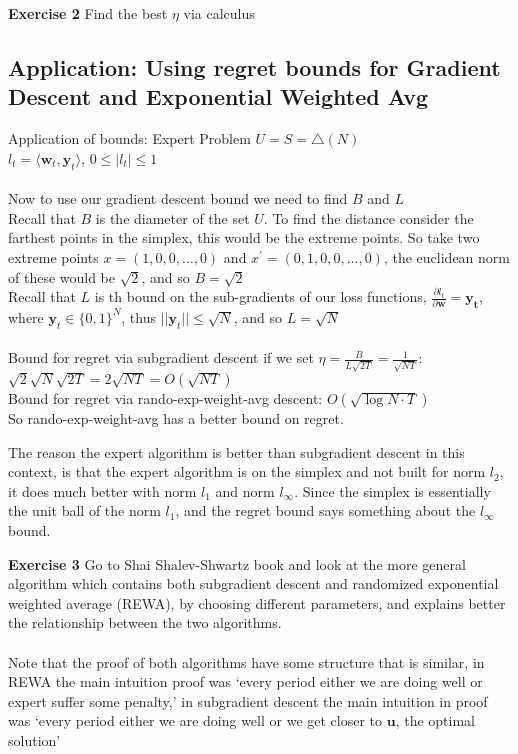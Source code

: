 \documentclass[11pt]{article}
\newcommand\tab[1][1cm]{\hspace*{#1}}
\theoremstyle{quest}
\begin{document}
\begin{tcolorbox}
\textbf{Exercise 2} Find the best $\eta$ via calculus 
\end{tcolorbox}

\subsection{Application: Using regret bounds for Gradient Descent and Exponential Weighted Avg}
\begin{tcolorbox}
Application of bounds: Expert Problem
$U=S=\triangle(N)$\\
$l_t = \langle \mathbf{w}_t, \mathbf{y}_t \rangle$, $0\le|l_t|\le 1$\\ \\ 
Now to use our gradient descent bound we need to find $B$ and $L$ \\
\tab Recall that $B$ is the diameter of the set $U$. To find the distance consider the farthest points in the simplex, this would be the extreme points. So take two extreme points $x = (1, 0 , 0, \dots, 0)$ and $x^\prime = (0, 1, 0 , 0, \dots, 0)$, the euclidean norm of these would be $\sqrt{2}$, and so $B=\sqrt{2}$\\
\tab Recall that $L$ is th bound on the sub-gradients of our loss functions, $\frac{\partial l_t}{\partial \mathbf{w}}=\mathbf{y_t}$, where $\mathbf{y}_t\in \{0,1\}^N$, thus $||\mathbf{y}_t||\le \sqrt{N}$, and so $L=\sqrt{N}$\\ \\

Bound for regret via subgradient descent if we set $\eta = \frac{B}{L\sqrt{2T}}=\frac{1}{\sqrt{NT}}$:  $\sqrt{2}\sqrt{N}\sqrt{2 T}=2\sqrt{NT} = O(\sqrt{NT})$\\ 
Bound for regret via rando-exp-weight-avg descent: $O(\sqrt{\log{N}\cdot T})$\\
So rando-exp-weight-avg has a better bound on regret. 
\end{tcolorbox}
The reason the expert algorithm is better than subgradient descent in this context, is that the expert algorithm is on the simplex and not built for norm $l_2 $, it does much better with norm $l_1$ and norm $l_\infty$. Since the simplex is essentially the unit ball of the norm $l_1$, and the regret bound says something about the $l_\infty$ bound. 

\begin{tcolorbox}
\textbf{Exercise 3} Go to Shai Shalev-Shwartz book and look at the more general algorithm which contains both subgradient descent and randomized exponential weighted average (REWA), by choosing different parameters, and explains better the relationship between the two algorithms. \\ \\
\tab Note that the proof of both algorithms have some structure that is similar, in REWA the main intuition proof was `every period either we are doing well or expert suffer some penalty,' in subgradient descent the main intuition in proof was `every period either we are doing well or we get closer to $\mathbf{u}$, the optimal solution'
\end{tcolorbox}
\end{document}
